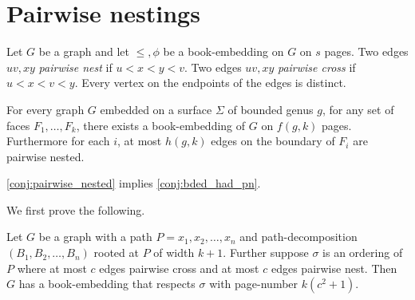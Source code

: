 

\section{Pairwise nestings}
Let $G$ be a graph and let $\leq, \phi$ be a book-embedding on $G$ on $s$ pages. Two edges $uv, xy$ \textit{pairwise nest} if $u < x < y < v$. Two edges $uv, xy$ \textit{pairwise cross} if $u < x < v < y$. Every vertex on the endpoints of the edges is distinct.

\begin{conjecture}\label{conj:pairwise_nested}
    For every graph $G$ embedded on a surface $\Sigma$ of bounded genus $g$, for any set of faces $F_1, \ldots, F_k$, there exists a book-embedding of $G$ on $f(g, k)$ pages. Furthermore for each $i$, at most $h(g, k)$ edges on the boundary of $F_i$ are pairwise nested. 
\end{conjecture}

\cref{conj:pairwise_nested} implies \cref{conj:bded_had_pn}. 

We first prove the following.
\begin{proposition}\label{prop:nested_edges}
    Let $G$ be a graph with a path $P = x_1, x_2, \ldots, x_n$ and  path-decomposition $(B_1, B_2, \ldots, B_n)$ rooted at $P$ of width $k + 1$. Further suppose $\sigma$ is an ordering of $P$ where at most $c$ edges pairwise cross and at most $c$ edges pairwise nest. Then $G$ has a book-embedding that respects $\sigma$ with page-number $k(c^2 + 1)$.
\end{proposition}

